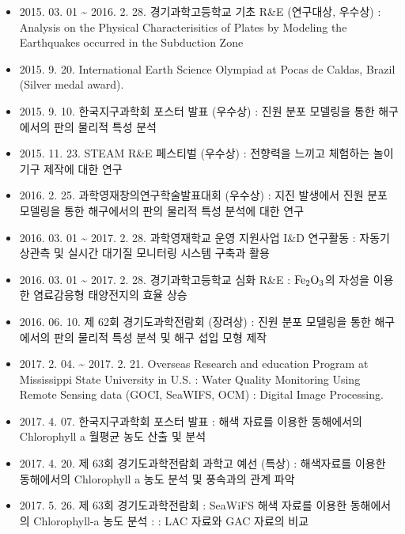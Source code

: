 \begin{researches}
\begin{itemize}
\item{2015. 03. 01 \~{} 2016. 2. 28. 경기과학고등학교 기초 R\&E (연구대상, 우수상) : Analysis on the Physical Characterisitics of Plates by Modeling the Earthquakes occurred in the Subduction Zone }
\item{2015. 9. 20. International Earth Science Olympiad at Pocas de Caldas, Brazil (Silver medal award).}
\item{2015. 9. 10. 한국지구과학회 포스터 발표 (우수상) : 진원 분포 모델링을 통한 해구에서의 판의 물리적 특성 분석 }
\item{2015. 11. 23. STEAM R\&E 페스티벌 (우수상) : 전향력을 느끼고 체험하는 놀이기구 제작에 대한 연구 }
\item{2016. 2. 25. 과학영재창의연구학술발표대회 (우수상) : 지진 발생에서 진원 분포 모델링을 통한 해구에서의 판의 물리적 특성 분석에 대한 연구 }
\item{2016. 03. 01 \~{} 2017. 2. 28. 과학영재학교 운영 지원사업 I\&D 연구활동 : 자동기상관측 및 실시간 대기질 모니터링 시스템 구축과 활용 }
\item{2016. 03. 01 \~{} 2017. 2. 28. 경기과학고등학교 심화 R\&E : $  \rm Fe_{2}O_{3}$의 자성을 이용한 염료감응형 태양전지의 효율 상승 }
\item{2016. 06. 10. 제 62회 경기도과학전람회 (장려상) : 진원 분포 모델링을 통한 해구에서의 판의 물리적 특성 분석 및 해구 섭입 모형 제작 }
\item{2017. 2. 04. \~{} 2017. 2. 21. Overseas Research and education Program at Mississippi State University in U.S. : Water Quality Monitoring Using Remote Sensing data (GOCI, SeaWIFS, OCM) : Digital Image Processing. }
\item{2017. 4. 07. 한국지구과학회 포스터 발표 : 해색 자료를 이용한 동해에서의 Chlorophyll a 월평균 농도 산출 및 분석 }
\item{2017. 4. 20. 제 63회 경기도과학전람회 과학고 예선 (특상) : 해색자료를 이용한 동해에서의 Chlorophyll a 농도 분석 및 풍속과의 관계 파악 }
\item{2017. 5. 26. 제 63회 경기도과학전람회 : SeaWiFS 해색 자료를 이용한 동해에서의 Chlorophyll-a 농도 분석 : : LAC 자료와 GAC 자료의 비교}
\end{itemize}
\end{researches}
